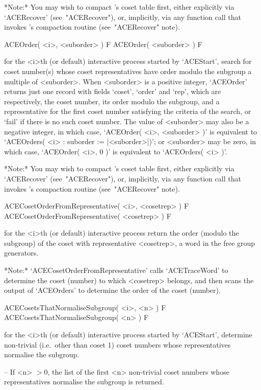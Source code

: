 *Note:*
You may wish to compact {\ACE}'s coset table first, either  explicitly
via `ACERecover' (see~"ACERecover"), or, implicitly, via any  function
call that invokes {\ACE}'s compaction routine (see~"ACERecover" note).

\>ACEOrder( <i>, <suborder> ) F
\>ACEOrder( <suborder> ) F

for the <i>th (or  default)  interactive  {\ACE}  process  started  by
`ACEStart', search for coset  number(s)  whose  coset  representatives
have  order  modulo  the  subgroup  a  multiple  of  <suborder>.  When
<suborder> is a positive integer, `ACEOrder' returns just  one  record
with fields `coset', `order' and `rep', which  are  respectively,  the
coset number, its order modulo the subgroup, and a representative  for
the first coset number satisfying  the  criteria  of  the  search,  or
`fail' if there is no such coset number. The value of  <suborder>  may
also be a negative integer, in which case, `ACEOrder( <i>,  <suborder>
)' is equivalent to `ACEOrders( <i> : suborder :=  |<suborder>|)';  or
<suborder> may be zero,  in  which  case,  `ACEOrder(  <i>,  0  )'  is
equivalent to `ACEOrders( <i> )'.

*Note:*
You may wish to compact {\ACE}'s coset table first, either  explicitly
via `ACERecover' (see~"ACERecover"), or, implicitly, via any  function
call that invokes {\ACE}'s compaction routine (see~"ACERecover" note).

\>ACECosetOrderFromRepresentative( <i>, <cosetrep> ) F
\>ACECosetOrderFromRepresentative( <cosetrep> ) F

for the <i>th (or default) interactive {\ACE} process return the order
(modulo the subgroup) of the coset with representative  <cosetrep>,  a
word in the free group generators.

*Note:*   
`ACECosetOrderFromRepresentative' calls  `ACETraceWord'  to  determine
the coset (number) to which <cosetrep> belongs,  and  then  scans  the
output of `ACEOrders' to determine the order of the coset (number).

\>ACECosetsThatNormaliseSubgroup( <i>, <n> ) F
\>ACECosetsThatNormaliseSubgroup( <n> ) F

for the <i>th (or  default)  interactive  {\ACE}  process  started  by
`ACEStart', determine non-trivial  (i.e.~other  than  coset  1)  coset
numbers whose representatives normalise the subgroup.

\beginlist

\item{--} If <n> $> 0$, the list of the first  <n>  non-trivial  coset
numbers whose representatives normalise the subgroup is returned.

